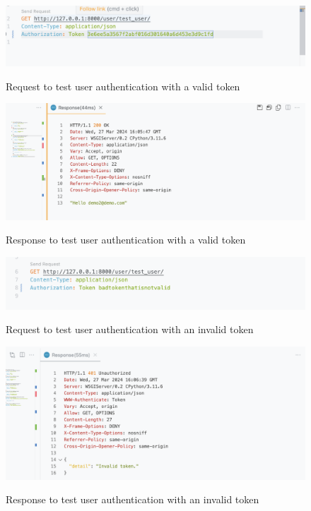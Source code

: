 \begin{figure}[H]
    \caption{Request to test user authentication with a valid token}
    \includegraphics[width=\textwidth]{Assets/api_test/request_test_user_authtoken.png}
    \label{fig:request_test_user_authtoken}
\end{figure}

\begin{figure}[H]
    \caption{Response to test user authentication with a valid token}
    \includegraphics[width=\textwidth]{Assets/api_test/response_test_user_authtoken.png}
    \label{fig:response_test_user_authtoken}
\end{figure}

\begin{figure}[H]
    \caption{Request to test user authentication with an invalid token}
    \includegraphics[width=\textwidth]{Assets/api_test/request_test_user_authtoken_invalid.png}
    \label{fig:request_test_user_authtoken_invalid}
\end{figure}

\begin{figure}[H]
    \caption{Response to test user authentication with an invalid token}
    \includegraphics[width=\textwidth]{Assets/api_test/response_test_user_authtoken_invalid.png}
    \label{fig:response_test_user_authtoken_invalid}
\end{figure}


